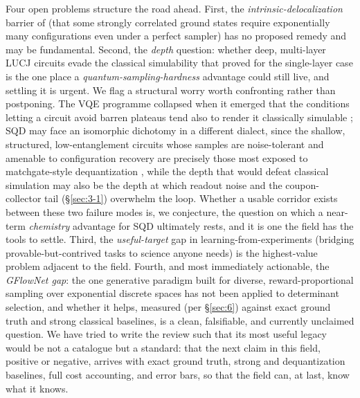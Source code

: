 \documentclass[11pt]{article}
\begin{document}
Four open problems structure the road ahead. First, the \emph{intrinsic-delocalization} barrier of \cite{gaberle2026} (that some strongly correlated ground states require exponentially many configurations even under a perfect sampler) has no proposed remedy and may be fundamental. Second, the \emph{depth} question: whether deep, multi-layer LUCJ circuits evade the classical simulability that \cite{belagali2026} proved for the single-layer case is the one place a \emph{quantum-sampling-hardness} advantage could still live, and settling it is urgent. We flag a structural worry worth confronting rather than postponing. The VQE programme collapsed when it emerged that the conditions letting a circuit avoid barren plateaus tend also to render it classically simulable \cite{cerezo2025}; SQD may face an isomorphic dichotomy in a different dialect, since the shallow, structured, low-entanglement circuits whose samples are noise-tolerant and amenable to configuration recovery are precisely those most exposed to matchgate-style dequantization \cite{belagali2026}, while the depth that would defeat classical simulation may also be the depth at which readout noise and the coupon-collector tail (\S\ref{sec:3-1}) overwhelm the loop. Whether a usable corridor exists between these two failure modes is, we conjecture, the question on which a near-term \emph{chemistry} advantage for SQD ultimately rests, and it is one the field has the tools to settle. Third, the \emph{useful-target} gap in learning-from-experiments (bridging provable-but-contrived tasks to science anyone needs) is the highest-value problem adjacent to the field. Fourth, and most immediately actionable, the \emph{GFlowNet gap}: the one generative paradigm built for diverse, reward-proportional sampling over exponential discrete spaces has not been applied to determinant selection, and whether it helps, measured (per \S\ref{sec:6}) against exact ground truth and strong classical baselines, is a clean, falsifiable, and currently unclaimed question. We have tried to write the review such that its most useful legacy would be not a catalogue but a standard: that the next claim in this field, positive or negative, arrives with exact ground truth, strong and dequantization baselines, full cost accounting, and error bars, so that the field can, at last, know what it knows.
\end{document}
